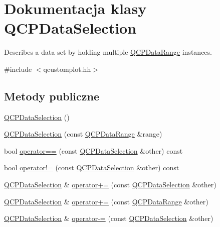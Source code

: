 \hypertarget{class_q_c_p_data_selection}{}\section{Dokumentacja klasy Q\+C\+P\+Data\+Selection}
\label{class_q_c_p_data_selection}


Describes a data set by holding multiple \hyperlink{class_q_c_p_data_range}{Q\+C\+P\+Data\+Range} instances.  




{\ttfamily \#include $<$qcustomplot.\+hh$>$}

\subsection*{Metody publiczne}
\begin{DoxyCompactItemize}
\item 
\hyperlink{class_q_c_p_data_selection_a0e0b7faaec7df1a7c77dd6f4883cdf0d}{Q\+C\+P\+Data\+Selection} ()
\item 
\hyperlink{class_q_c_p_data_selection_a738dfb4f5718c5df5ed35ea33ac37818}{Q\+C\+P\+Data\+Selection} (const \hyperlink{class_q_c_p_data_range}{Q\+C\+P\+Data\+Range} \&range)
\item 
bool \hyperlink{class_q_c_p_data_selection_a2489ba93bca3f4f5dc5951eff7d84300}{operator==} (const \hyperlink{class_q_c_p_data_selection}{Q\+C\+P\+Data\+Selection} \&other) const 
\item 
bool \hyperlink{class_q_c_p_data_selection_afade4352fad85f165fa29797d5943330}{operator!=} (const \hyperlink{class_q_c_p_data_selection}{Q\+C\+P\+Data\+Selection} \&other) const 
\item 
\hyperlink{class_q_c_p_data_selection}{Q\+C\+P\+Data\+Selection} \& \hyperlink{class_q_c_p_data_selection_a4584d4b0ea5c4f095bd7b70f88eb5d9d}{operator+=} (const \hyperlink{class_q_c_p_data_selection}{Q\+C\+P\+Data\+Selection} \&other)
\item 
\hyperlink{class_q_c_p_data_selection}{Q\+C\+P\+Data\+Selection} \& \hyperlink{class_q_c_p_data_selection_a17058640d4e6f49984a0e7e42043df1b}{operator+=} (const \hyperlink{class_q_c_p_data_range}{Q\+C\+P\+Data\+Range} \&other)
\item 
\hyperlink{class_q_c_p_data_selection}{Q\+C\+P\+Data\+Selection} \& \hyperlink{class_q_c_p_data_selection_a66f9fab70b026baa64bf8e52fe5de07e}{operator-\/=} (const \hyperlink{class_q_c_p_data_selection}{Q\+C\+P\+Data\+Selection} \&other)
\item 

\end{DoxyCompactItemize}
